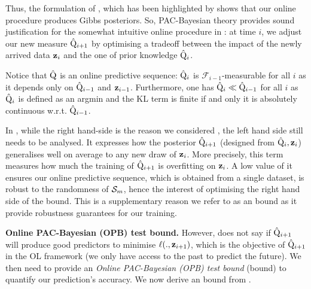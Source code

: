   Thus, the formulation of , which has been highlighted by \citet[Sec. 5.1]{catoni2003pac} shows that our online procedure produces Gibbs posteriors.
 So, PAC-Bayesian theory provides sound justification for the somewhat intuitive online procedure in : at time $i$, we adjust our new measure $\hat{\mathrm{Q}}_{i+1}$ by optimising a tradeoff between the impact of the newly arrived data $\mathbf{z}_i$ and the one of prior knowledge $\hat{\mathrm{Q}}_i$.


 Notice that $\hat{\mathrm{Q}}$ is an online predictive sequence: $\hat{\mathrm{Q}}_i$ is $\mathcal{F}_{i-1}$-measurable for all $i$ as it depends only on $\hat{\mathrm{Q}}_{i-1}$ and $\mathbf{z}_{i-1}$. Furthermore, one has $\hat{\mathrm{Q}}_{i} \ll \hat{\mathrm{Q}}_{i-1}$ for all $i$ as $\hat{\mathrm{Q}}_{i}$ is defined as an argmin and the KL term is finite if and only it is absolutely continuous w.r.t. $\hat{\mathrm{Q}}_{i-1}$.


\begin{remark}
  In , while the right hand-side is the reason we considered , the left hand side still needs to be analysed. It expresses how the posterior $\hat{\mathrm{Q}}_{i+1}$ (designed from $\hat{\mathrm{Q}}_i,\mathbf{z}_i$) generalises well on average to any new draw of $\mathbf{z}_i$. More precisely, this term measures how much the training of $\hat{\mathrm{Q}}_{i+1}$ is overfitting on $\mathbf{z}_i$. A low value of it ensures our online predictive sequence, which is obtained from a single dataset, is robust to the randomness of $\mathcal{S}_m$, hence the interest of optimising the right hand side of the bound.
  This is a supplementary reason we refer to  as an \OPBTrain bound as it provide robustness guarantees for our training.
\end{remark}



\textbf{Online PAC-Bayesian (OPB) test bound.}
However,  does not say if $\hat{\mathrm{Q}}_{i+1}$ will produce good predictors to minimise $\ell(.,\mathbf{z}_{i+1})$, which is the objective of $\hat{\mathrm{Q}}_{i+1}$ in the OL framework (we only have access to the past to predict the future). We then need to provide an \emph{Online PAC-Bayesian (OPB) test bound} (\OPBTest bound) to quantify our prediction's accuracy. We now derive an \OPBTest bound from .

